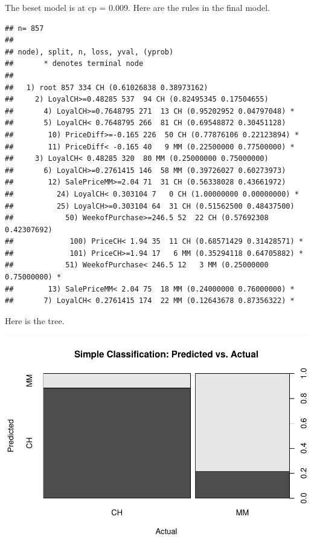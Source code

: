 \documentclass[
]{book}
\newenvironment{Shaded}{\begin{snugshade}}{\end{snugshade}}
\newcommand{\DecValTok}[1]{\textcolor[rgb]{0.00,0.00,0.81}{#1}}
\newcommand{\KeywordTok}[1]{\textcolor[rgb]{0.13,0.29,0.53}{\textbf{#1}}}
\newcommand{\NormalTok}[1]{#1}
\newcommand{\OperatorTok}[1]{\textcolor[rgb]{0.81,0.36,0.00}{\textbf{#1}}}
\begin{document}
The beset model is at cp = 0.009. Here are the rules in the final model.

\begin{Shaded}
\end{Shaded}

\begin{verbatim}
## n= 857 
## 
## node), split, n, loss, yval, (yprob)
##       * denotes terminal node
## 
##   1) root 857 334 CH (0.61026838 0.38973162)  
##     2) LoyalCH>=0.48285 537  94 CH (0.82495345 0.17504655)  
##       4) LoyalCH>=0.7648795 271  13 CH (0.95202952 0.04797048) *
##       5) LoyalCH< 0.7648795 266  81 CH (0.69548872 0.30451128)  
##        10) PriceDiff>=-0.165 226  50 CH (0.77876106 0.22123894) *
##        11) PriceDiff< -0.165 40   9 MM (0.22500000 0.77500000) *
##     3) LoyalCH< 0.48285 320  80 MM (0.25000000 0.75000000)  
##       6) LoyalCH>=0.2761415 146  58 MM (0.39726027 0.60273973)  
##        12) SalePriceMM>=2.04 71  31 CH (0.56338028 0.43661972)  
##          24) LoyalCH< 0.303104 7   0 CH (1.00000000 0.00000000) *
##          25) LoyalCH>=0.303104 64  31 CH (0.51562500 0.48437500)  
##            50) WeekofPurchase>=246.5 52  22 CH (0.57692308 0.42307692)  
##             100) PriceCH< 1.94 35  11 CH (0.68571429 0.31428571) *
##             101) PriceCH>=1.94 17   6 MM (0.35294118 0.64705882) *
##            51) WeekofPurchase< 246.5 12   3 MM (0.25000000 0.75000000) *
##        13) SalePriceMM< 2.04 75  18 MM (0.24000000 0.76000000) *
##       7) LoyalCH< 0.2761415 174  22 MM (0.12643678 0.87356322) *
\end{verbatim}

Here is the tree.

\begin{Shaded}
\end{Shaded}

\includegraphics{data-sci_files/figure-latex/unnamed-chunk-54-1.pdf}
\end{document}

